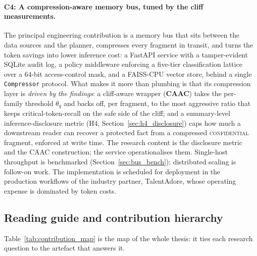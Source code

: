 \paragraph{C4: A compression-aware memory bus, tuned by the cliff
measurements.}
The principal engineering contribution is a memory bus that sits
between the data sources and the planner, compresses every fragment
in transit, and turns the token savings into lower inference cost: a
FastAPI service with a tamper-evident SQLite audit log, a policy
middleware enforcing a five-tier classification lattice over a
$64$-bit access-control mask, and a FAISS-CPU vector store, behind a
single \texttt{Compressor} protocol. What makes it more than
plumbing is that its compression layer is \emph{driven by the
findings}: a cliff-aware wrapper (\textbf{CAAC}) takes the
per-family threshold $\theta_q$ and backs off, per fragment, to the
most aggressive ratio that keeps critical-token-recall on the safe
side of the cliff; and a summary-level inference-disclosure metric
(H4, Section~\ref{sec:h4_disclosure}) caps how much a downstream
reader can recover a protected fact from a compressed
\textsc{confidential} fragment, enforced at write time. The research
content is the disclosure metric and the CAAC construction; the
service operationalises them. Single-host throughput is benchmarked
(Section~\ref{sec:bus_bench}); distributed scaling is follow-on work.
The implementation is scheduled for deployment in the production
workflows of the industry partner, TalentAdore, whose operating
expense is dominated by token costs.

\subsection{Reading guide and contribution hierarchy}
\label{sec:reading_guide}

Table~\ref{tab:contribution_map} is the map of the whole
thesis: it ties each research question to the artefact that answers
it.

